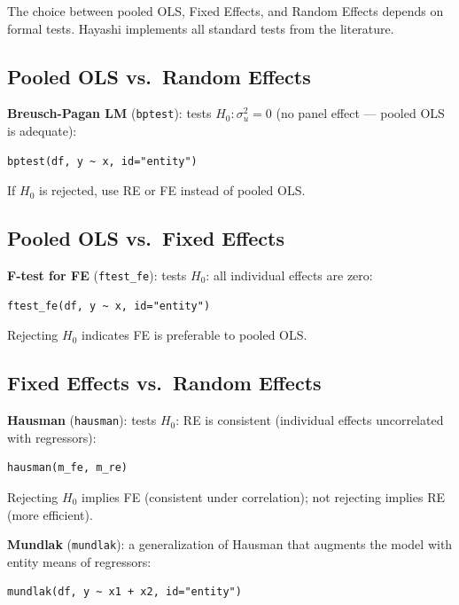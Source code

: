 The choice between pooled OLS, Fixed Effects, and Random Effects depends on
formal tests. Hayashi implements all standard tests from the literature.

\subsection{Pooled OLS vs.\ Random Effects}

\textbf{Breusch-Pagan LM} (\texttt{bptest}): tests $H_0: \sigma_u^2 = 0$
(no panel effect --- pooled OLS is adequate):

\begin{lstlisting}
bptest(df, y ~ x, id="entity")
\end{lstlisting}

If $H_0$ is rejected, use RE or FE instead of pooled OLS.

\subsection{Pooled OLS vs.\ Fixed Effects}

\textbf{F-test for FE} (\texttt{ftest\_fe}): tests $H_0$: all individual
effects are zero:

\begin{lstlisting}
ftest_fe(df, y ~ x, id="entity")
\end{lstlisting}

Rejecting $H_0$ indicates FE is preferable to pooled OLS.

\subsection{Fixed Effects vs.\ Random Effects}

\textbf{Hausman} (\texttt{hausman}): tests $H_0$: RE is consistent
(individual effects uncorrelated with regressors):

\begin{lstlisting}
hausman(m_fe, m_re)
\end{lstlisting}

Rejecting $H_0$ implies FE (consistent under correlation); not rejecting
implies RE (more efficient).

\textbf{Mundlak} (\texttt{mundlak}): a generalization of Hausman that
augments the model with entity means of regressors:

\begin{lstlisting}
mundlak(df, y ~ x1 + x2, id="entity")
\end{lstlisting}

